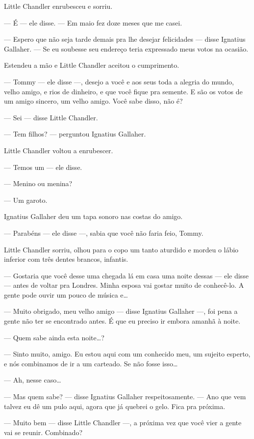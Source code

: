 Little Chandler enrubesceu e sorriu.

--- É --- ele disse.  --- Em maio fez doze meses que me casei.

--- Espero que não seja tarde demais pra lhe desejar felicidades --- disse
Ignatius Gallaher.  --- Se eu soubesse seu endereço teria expressado meus votos
na ocasião.

Estendeu a mão e Little Chandler aceitou o cumprimento.

--- Tommy --- ele disse ---, desejo a você e aos seus toda a alegria do mundo,
velho amigo, e rios de dinheiro, e que você fique pra semente.  E são os votos
de um amigo sincero, um velho amigo.  Você sabe disso, não é?

--- Sei --- disse Little Chandler.

--- Tem filhos? --- perguntou Ignatius Gallaher.

Little Chandler voltou a enrubescer.

--- Temos um --- ele disse.

--- Menino ou menina?

--- Um garoto.

Ignatius Gallaher deu um tapa sonoro nas costas do amigo.

--- Parabéns --- ele disse ---, sabia que você não faria feio, Tommy.

Little Chandler sorriu, olhou para o copo um tanto aturdido e mordeu o lábio
inferior com três dentes brancos, infantis.

--- Gostaria que você desse uma chegada lá em casa uma noite dessas --- ele
disse --- antes de voltar pra Londres.  Minha esposa vai gostar muito de
conhecê-lo.  A gente pode ouvir um pouco de música e\ldots{}

--- Muito obrigado, meu velho amigo --- disse Ignatius Gallaher ---, foi pena a
gente não ter se encontrado antes.  É que eu preciso ir embora amanhã à noite.

--- Quem sabe ainda esta noite\ldots{}?

--- Sinto muito, amigo.  Eu estou aqui com um conhecido meu, um sujeito
esperto, e nós combinamos de ir a um carteado.  Se não fosse isso\ldots{}

--- Ah, nesse caso\ldots{}

--- Mas quem sabe? --- disse Ignatius Gallaher respeitosamente.  --- Ano que
vem talvez eu dê um pulo aqui, agora que já quebrei o gelo.  Fica pra próxima.

--- Muito bem --- disse Little Chandler ---, a próxima vez que você vier a
gente vai se reunir.  Combinado?

